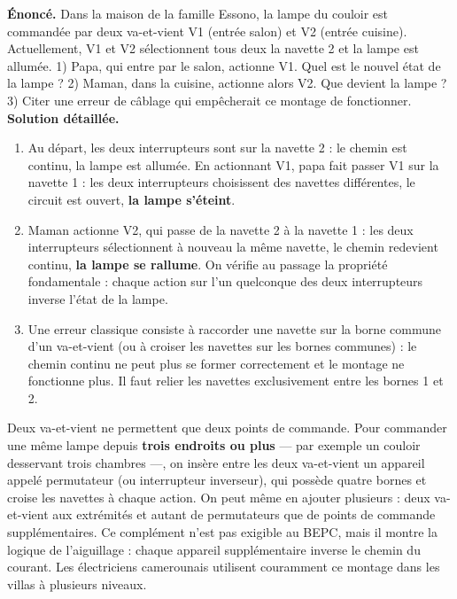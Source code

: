 \documentclass[11pt]{article}
\newcommand{\cle}[1]{{\popxbold\color{popdark}#1}}
\begin{document}
\begin{exoresolu}
\textbf{Énoncé.} Dans la maison de la famille Essono, la lampe du couloir est commandée par deux va-et-vient V1 (entrée salon) et V2 (entrée cuisine). Actuellement, V1 et V2 sélectionnent tous deux la navette 2 et la lampe est allumée. 1) Papa, qui entre par le salon, actionne V1. Quel est le nouvel état de la lampe ? 2) Maman, dans la cuisine, actionne alors V2. Que devient la lampe ? 3) Citer une erreur de câblage qui empêcherait ce montage de fonctionner.
\tcblower
\textbf{Solution détaillée.}
\begin{enumerate}
\item Au départ, les deux interrupteurs sont sur la navette 2 : le chemin est continu, la lampe est allumée. En actionnant V1, papa fait passer V1 sur la navette 1 : les deux interrupteurs choisissent des navettes différentes, le circuit est ouvert, \textbf{la lampe s'éteint}.
\item Maman actionne V2, qui passe de la navette 2 à la navette 1 : les deux interrupteurs sélectionnent à nouveau la même navette, le chemin redevient continu, \textbf{la lampe se rallume}. On vérifie au passage la propriété fondamentale : chaque action sur l'un quelconque des deux interrupteurs inverse l'état de la lampe.
\item Une erreur classique consiste à raccorder une navette sur la borne commune d'un va-et-vient (ou à croiser les navettes sur les bornes communes) : le chemin continu ne peut plus se former correctement et le montage ne fonctionne plus. Il faut relier les navettes exclusivement entre les bornes 1 et 2.
\end{enumerate}
\end{exoresolu}

\begin{savaistu}
Deux va-et-vient ne permettent que deux points de commande. Pour commander une même lampe depuis \textbf{trois endroits ou plus} — par exemple un couloir desservant trois chambres —, on insère entre les deux va-et-vient un appareil appelé \cle{permutateur} (ou interrupteur inverseur), qui possède quatre bornes et croise les navettes à chaque action. On peut même en ajouter plusieurs : deux va-et-vient aux extrémités et autant de permutateurs que de points de commande supplémentaires. Ce complément n'est pas exigible au BEPC, mais il montre la logique de l'aiguillage : chaque appareil supplémentaire inverse le chemin du courant. Les électriciens camerounais utilisent couramment ce montage dans les villas à plusieurs niveaux.
\end{savaistu}
\end{document}
